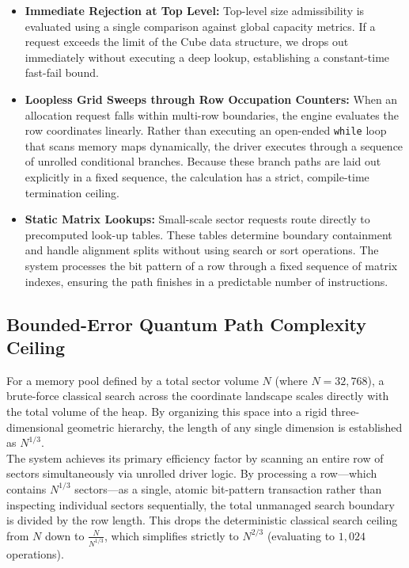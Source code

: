 \documentclass[11pt]{article}
\begin{document}
\begin{itemize}
    \item \textbf{Immediate Rejection at Top Level:} Top-level size admissibility is evaluated using a single comparison against global capacity metrics. If a request exceeds the limit of the Cube data structure, we drops out immediately without executing a deep lookup, establishing a constant-time fast-fail bound.
    
    \item \textbf{Loopless Grid Sweeps through Row Occupation Counters:} When an allocation request falls within multi-row boundaries, the engine evaluates the row coordinates linearly. Rather than executing an open-ended \texttt{while} loop that scans memory maps dynamically, the driver executes through a sequence of unrolled conditional branches. Because these branch paths are laid out explicitly in a fixed sequence, the calculation has a strict, compile-time termination ceiling.
    
    \item \textbf{Static Matrix Lookups:} Small-scale sector requests route directly to precomputed look-up tables. These tables determine boundary containment and handle alignment splits without using search or sort operations. The system processes the bit pattern of a row through a fixed sequence of matrix indexes, ensuring the path finishes in a predictable number of instructions.
\end{itemize}

\subsection{Bounded-Error Quantum Path Complexity Ceiling}

For a memory pool defined by a total sector volume $N$ (where $N = 32,768$), a brute-force classical search across the coordinate landscape scales directly with the total volume of the heap. By organizing this space into a rigid three-dimensional geometric hierarchy, the length of any single dimension is established as $N^{1/3}$.\\

The system achieves its primary efficiency factor by scanning an entire row of sectors simultaneously via unrolled driver logic. By processing a row---which contains $N^{1/3}$ sectors---as a single, atomic bit-pattern transaction rather than inspecting individual sectors sequentially, the total unmanaged search boundary is divided by the row length. This drops the deterministic classical search ceiling from $N$ down to $\frac{N}{N^{1/3}}$, which simplifies strictly to $N^{2/3}$ (evaluating to $1,024$ operations).\\
\end{document}
